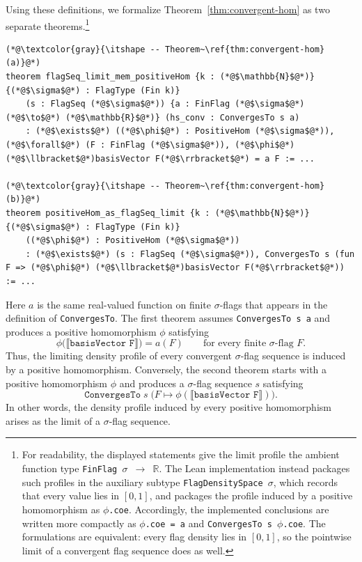 \documentclass{article}
\newcommand{\lean}[1]{\texttt{#1}}
\begin{document}
Using these definitions, we formalize Theorem~\ref{thm:convergent-hom} as two
separate theorems.\footnote{For readability, the displayed statements give the
limit profile the ambient function type
\lean{FinFlag $\sigma$ $\to$ $\mathbb{R}$}.  The Lean implementation instead
packages such profiles in the auxiliary subtype
\lean{FlagDensitySpace}~\(\sigma\), which records that every value lies in
\([0,1]\), and packages the profile induced by a positive homomorphism as
\lean{$\phi$.coe}.  Accordingly, the implemented conclusions are written more
compactly as \lean{$\phi$.coe = a} and
\lean{ConvergesTo s $\phi$.coe}.  The formulations are equivalent: every flag
density lies in \([0,1]\), so the pointwise limit of a convergent flag sequence
does as well.}
\begin{lstlisting}
(*@\textcolor{gray}{\itshape -- Theorem~\ref{thm:convergent-hom} (a)}@*)
theorem flagSeq_limit_mem_positiveHom {k : (*@$\mathbb{N}$@*)} {(*@$\sigma$@*) : FlagType (Fin k)}
    (s : FlagSeq (*@$\sigma$@*)) {a : FinFlag (*@$\sigma$@*) (*@$\to$@*) (*@$\mathbb{R}$@*)} (hs_conv : ConvergesTo s a)
    : (*@$\exists$@*) ((*@$\phi$@*) : PositiveHom (*@$\sigma$@*)), (*@$\forall$@*) (F : FinFlag (*@$\sigma$@*)), (*@$\phi$@*) (*@$\llbracket$@*)basisVector F(*@$\rrbracket$@*) = a F := ...

(*@\textcolor{gray}{\itshape -- Theorem~\ref{thm:convergent-hom} (b)}@*)
theorem positiveHom_as_flagSeq_limit {k : (*@$\mathbb{N}$@*)} {(*@$\sigma$@*) : FlagType (Fin k)}
    ((*@$\phi$@*) : PositiveHom (*@$\sigma$@*))
    : (*@$\exists$@*) (s : FlagSeq (*@$\sigma$@*)), ConvergesTo s (fun F => (*@$\phi$@*) (*@$\llbracket$@*)basisVector F(*@$\rrbracket$@*)) := ...
\end{lstlisting}
Here \(a\) is the same real-valued function on finite \(\sigma\)-flags that
appears in the definition of \lean{ConvergesTo}.  The first theorem assumes
\lean{ConvergesTo s a} and produces a positive homomorphism \(\phi\) satisfying
\[
  \phi\bigl(\llbracket\lean{basisVector F}\rrbracket\bigr)=a(F)
  \qquad\text{for every finite \(\sigma\)-flag \(F\)}.
\]
Thus, the limiting density profile of every convergent \(\sigma\)-flag
sequence is induced by a positive homomorphism.  Conversely, the second
theorem starts with a positive homomorphism \(\phi\) and produces a
\(\sigma\)-flag sequence \(s\) satisfying
\[
  \lean{ConvergesTo}\;s\;
    \bigl(F\mapsto\phi(\llbracket\lean{basisVector F}\rrbracket)\bigr).
\]
In other words, the density profile induced by every positive homomorphism
arises as the limit of a \(\sigma\)-flag sequence.
\end{document}
